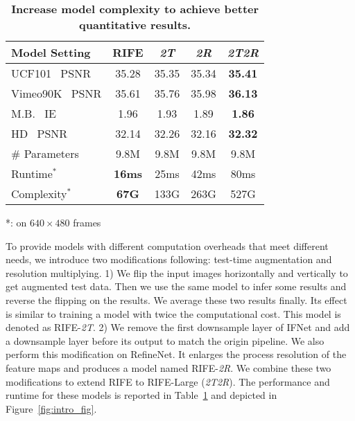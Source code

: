 \documentclass[final]{cvpr}
\def\red#1{\textcolor{MyRed}{#1}}
\def\first#1{\red{\textbf{#1}}}
\begin{document}
\begin{table}[t]
	\caption{\textbf{Increase model complexity to achieve better quantitative results.} }\label{tab:large}
	\centering
	\begin{tabular}{lcccc}
		\hline
		Model Setting  & RIFE & \textit{2T} & \textit{2R} & \textit{2T2R} \\ \hline
		UCF101~\cite{soomro2012ucf101} PSNR & 35.28 & 35.35 & 35.34 & \first{35.41} \\
		Vimeo90K~\cite{xue2019video} PSNR& 35.61 & 35.76 & 35.98 & \first{36.13}\\ M.B.~\cite{baker2011database} IE & 1.96 & 1.93    & 1.89 & \first{1.86}
		\\
		HD~\cite{bao2019depth} PSNR& 32.14 & 32.26 & 32.16 & \first{32.32} \\ 

		\# Parameters & 9.8M & 9.8M & 9.8M & 9.8M\\ Runtime$^*$ & \first{16ms} & 25ms & 42ms & 80ms\\
		
		Complexity$^*$ & \first{67G} & 133G & 263G & 527G\\
		\hline
	\end{tabular}
	\normalsize
	\begin{tablenotes}
		\raggedleft
		\item{
			*: on $640\times 480$ frames
		}
	\end{tablenotes}
\end{table}

To provide models with different computation overheads that meet different needs, we introduce two modifications following: test-time augmentation and resolution multiplying. 1) We flip the input images horizontally and vertically to get augmented test data. Then we use the same model to infer some results and reverse the flipping on the results. We average these two results finally. Its effect is similar to training a model with twice the computational cost. This model is denoted as RIFE-\textit{2T}. 2) We remove the first downsample layer of IFNet and add a downsample layer before its output to match the origin pipeline. We also perform this modification on RefineNet. It enlarges the process resolution of the feature maps and produces a model named RIFE-\textit{2R}. We combine these two modifications to extend RIFE to RIFE-Large (\textit{2T2R}). The performance and runtime for these models is reported in Table~\ref{tab:large} and depicted in Figure~\ref{fig:intro_fig}. 
\end{document}
